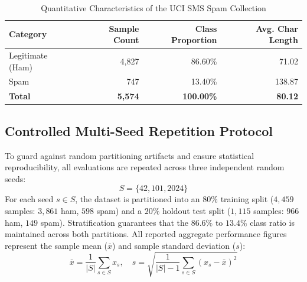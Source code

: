 \documentclass[conference]{IEEEtran}
\begin{document}
\begin{table}[htbp]
\caption{Quantitative Characteristics of the UCI SMS Spam Collection}
\label{tab:dataset_specs}
\centering
\begin{tabular}{lrrr}
\toprule
\textbf{Category} & \textbf{Sample Count} & \textbf{Class Proportion} & \textbf{Avg. Char Length} \\
\midrule
Legitimate (Ham)  & 4,827                 & 86.60\%                  & 71.02 \\
Spam              & 747                   & 13.40\%                  & 138.87 \\
\midrule
\textbf{Total}    & \textbf{5,574}        & \textbf{100.00\%}        & \textbf{80.12} \\
\bottomrule
\end{tabular}
\end{table}

\subsection{Controlled Multi-Seed Repetition Protocol}
To guard against random partitioning artifacts and ensure statistical reproducibility, all evaluations are repeated across three independent random seeds:
\begin{equation}
S = \{42, 101, 2024\}
\end{equation}
For each seed $s \in S$, the dataset is partitioned into an $80\%$ training split ($4,459$ samples: $3,861$ ham, $598$ spam) and a $20\%$ holdout test split ($1,115$ samples: $966$ ham, $149$ spam). Stratification guarantees that the $86.6\%$ to $13.4\%$ class ratio is maintained across both partitions. All reported aggregate performance figures represent the sample mean ($\bar{x}$) and sample standard deviation ($s$):
\begin{equation}
\bar{x} = \frac{1}{|S|} \sum_{s \in S} x_s, \quad s = \sqrt{\frac{1}{|S| - 1} \sum_{s \in S} (x_s - \bar{x})^2}
\end{equation}
\end{document}
